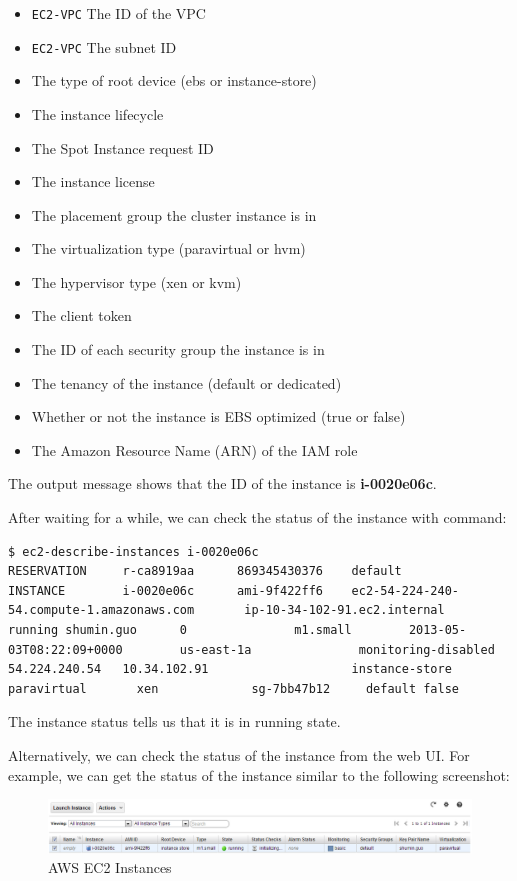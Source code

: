 \begin{itemize}
  \item \verb|EC2-VPC| The ID of the VPC
  \item \verb|EC2-VPC| The subnet ID
  \item The type of root device (ebs or instance-store)
  \item The instance lifecycle
  \item The Spot Instance request ID
  \item The instance license
  \item The placement group the cluster instance is in
  \item The virtualization type (paravirtual or hvm)
  \item The hypervisor type (xen or kvm)
  \item The client token
  \item The ID of each security group the instance is in
  \item The tenancy of the instance (default or dedicated)
  \item Whether or not the instance is EBS optimized (true or false)
  \item The Amazon Resource Name (ARN) of the IAM role
\end{itemize}

The output message shows that the ID of the instance is \textbf{i-0020e06c}.


After waiting for a while, we can check the status of the instance with command:
\lstset{style=bashstyle}
\begin{lstlisting}
$ ec2-describe-instances i-0020e06c
RESERVATION     r-ca8919aa      869345430376    default
INSTANCE        i-0020e06c      ami-9f422ff6    ec2-54-224-240-54.compute-1.amazonaws.com       ip-10-34-102-91.ec2.internal      running shumin.guo      0               m1.small        2013-05-03T08:22:09+0000        us-east-1a               monitoring-disabled      54.224.240.54   10.34.102.91                    instance-store                                  paravirtual       xen             sg-7bb47b12     default false
\end{lstlisting}

The instance status tells us that it is in running state.

Alternatively, we can check the status of the instance from the web UI. For example, we can get the status of the instance similar to the following screenshot:
\begin{figure}[h]
  \centering
  \includegraphics[width=\textwidth]{figs/5163os_08_21.png}
  \caption{AWS EC2 Instances}\label{fig:aws.ec2.instances}
\end{figure} 

